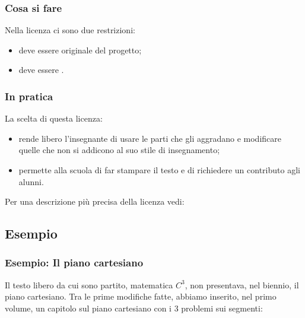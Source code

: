 \documentclass{beamer} %
\begin{document}
\begin{frame}\frametitle{Cosa si  fare}

Nella licenza ci sono due restrizioni:

\bigskip
\begin{itemize} [<+->]
\item deve essere  originale del progetto;
\item deve essere .
\end{itemize}

\end{frame}


\begin{frame}\frametitle{In pratica}

La scelta di questa licenza:

\bigskip
\begin{itemize} [<+->]
\item rende libero l'insegnante di usare le parti che 
gli aggradano e modificare quelle che non si addicono al suo stile di 
insegnamento;
\item permette alla scuola di far stampare il testo e di richiedere un 
contributo agli alunni.
\end{itemize}

\bigskip
\pause[\thebeamerpauses]
Per una descrizione più precisa della licenza vedi:

\vspace{1em}
{\footnotesize
{}
}

\end{frame}

\subsection{Esempio} 


\begin{frame}\frametitle{Esempio: Il piano cartesiano}

Il testo libero da cui sono partito, matematica 
\(C^3\), non presentava, nel biennio, il piano cartesiano. 
Tra le prime modifiche fatte, abbiamo inserito, nel primo volume, un 
capitolo sul piano cartesiano con i 3 problemi sui segmenti:

\end{frame}
\end{document}
